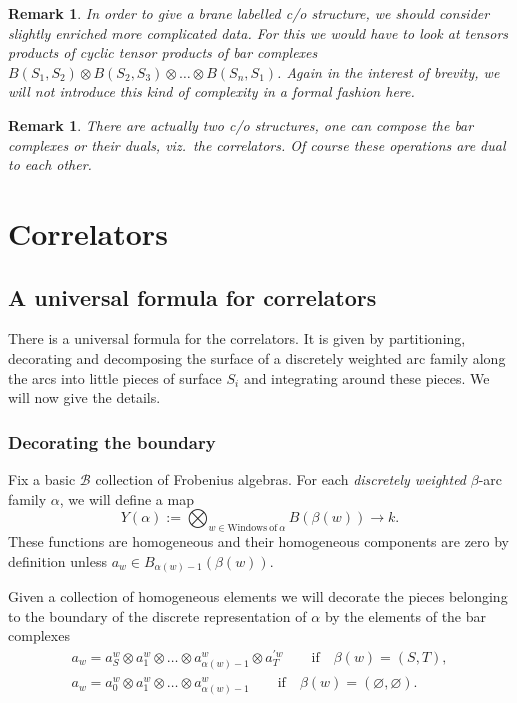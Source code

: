 \documentclass[pdftex]{sigma}
\newtheorem{rmk}[thm]{Remark}
\def\calB{{\mathcal B}}
\def\oto{\otimes \dots \otimes}
\begin{document}
\begin{rmk}
In order to give a brane labelled c/o structure, we should consider
slightly enriched more complicated data. For this we would have to
look at tensors products of cyclic tensor products of bar complexes
$B(S_1,S_2)\otimes B(S_2,S_3)\oto B(S_n,S_1)$. Again in the interest
of brevity, we will not introduce this kind of complexity in a
formal fashion here.
\end{rmk}

\begin{rmk}
There are actually two c/o structures, one can compose the bar
complexes or their duals, viz.\ the correlators. Of course these
operations are dual to each other.
\end{rmk}


\section{Correlators}
\label{corsection}

\subsection{A universal formula for  correlators}
 There is a universal formula for the correlators. It is given by partitioning, decorating
and  de\-com\-posing the surface of a discretely weighted arc family
  along the arcs into little pieces of surface $S_i$ and integrating around
these pieces. We will now give the details.



\subsubsection{Decorating the boundary}
Fix a basic $\calB$ collection of Frobenius algebras.  For each {\em
discretely weighted} $\beta$-arc family $\alpha$,  we will def\/ine a
map
\[
Y(\alpha):= \bigotimes_{w \in \mathrm {Windows~of~}\alpha}B(\beta(w))\to k.
\]
These functions are homogeneous and their homogeneous components  are  zero by def\/inition unless
 $a_w\in B_{\alpha(w)-1}(\beta(w)) $.

Given a collection of homogeneous elements
we will decorate the pieces belonging to the boundary of the discrete representation of $\alpha$ by
the elements of the bar complexes
\begin{gather*}
a_w = a^w_S\otimes a_1^w \oto a^w_{\alpha(w)-1}\otimes a_T^{\prime w} \qquad \text{if} \quad \beta(w)=(S,T),\\
a_w = a^w_0\otimes a_1^w \oto a^w_{\alpha(w)-1}  \qquad \text{if} \quad
\beta(w)=(\varnothing,\varnothing).
\end{gather*}
\end{document}
